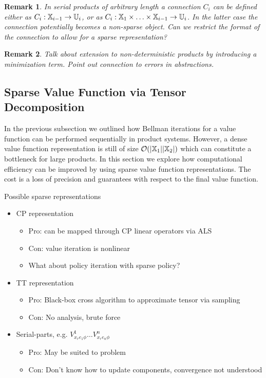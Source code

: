 \documentclass[conference]{IEEEtran}
\newtheorem{remark}{Remark}
\newcommand{\red}[1]{{\color{red} #1 }}
\begin{document}
\begin{remark}
  In serial products of arbitrary length a connection $C_i$ can be defined either as $C_i: \mathbb{X}_{i-1} \rightarrow \mathbb{U}_i$, or as $C_i: \mathbb{X}_1 \times \ldots \times \mathbb{X}_{i-1} \rightarrow \mathbb{U}_i$. In the latter case the connection potentially becomes a non-sparse object. \red{Can we restrict the format of the connection to allow for a sparse representation?}
\end{remark}

\begin{remark}
  \red{Talk about extension to non-deterministic products by introducing a minimization term. Point out connection to errors in abstractions.} 
\end{remark}

\subsection{Sparse Value Function via Tensor Decomposition}

In the previous subsection we outlined how Bellman iterations for a value function can be performed sequentially in product systems. However, a dense value function representation is still of size $\mathcal O (|\mathbb{X}_1| |\mathbb{X}_2|)$ which can constitute a bottleneck for large products. In this section we explore how computational efficiency can be improved by using sparse value function representations. The cost is a loss of precision and guarantees with respect to the final value function.

Possible sparse representations
\begin{itemize}
  \item CP representation
  \begin{itemize}
    \item Pro: can be mapped through CP linear operators via ALS
    \item Con: value iteration is nonlinear
    \item What about policy iteration with sparse policy? 
  \end{itemize}
  \item TT representation
  \begin{itemize}
    \item Pro: Black-box cross algorithm to approximate tensor via sampling
    \item Con: No analysis, brute force
  \end{itemize}
  \item Serial-parts, e.g. $V^1_{x_r e_1 \phi} \ldots V^n_{x_r e_n \phi}$
  \begin{itemize}
    \item Pro: May be suited to problem
    \item Con: Don't know how to update components, convergence not understood
  \end{itemize}
\end{itemize}
\end{document}

